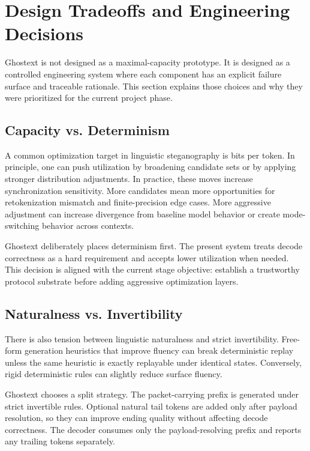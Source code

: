 \section{Design Tradeoffs and Engineering Decisions}

Ghostext is not designed as a maximal-capacity prototype. It is designed as a controlled engineering system where each component has an explicit failure surface and traceable rationale. This section explains those choices and why they were prioritized for the current project phase.

\subsection{Capacity vs. Determinism}

A common optimization target in linguistic steganography is bits per token. In principle, one can push utilization by broadening candidate sets or by applying stronger distribution adjustments. In practice, these moves increase synchronization sensitivity. More candidates mean more opportunities for retokenization mismatch and finite-precision edge cases. More aggressive adjustment can increase divergence from baseline model behavior or create mode-switching behavior across contexts.

Ghostext deliberately places determinism first. The present system treats decode correctness as a hard requirement and accepts lower utilization when needed. This decision is aligned with the current stage objective: establish a trustworthy protocol substrate before adding aggressive optimization layers.

\subsection{Naturalness vs. Invertibility}

There is also tension between linguistic naturalness and strict invertibility. Free-form generation heuristics that improve fluency can break deterministic replay unless the same heuristic is exactly replayable under identical states. Conversely, rigid deterministic rules can slightly reduce surface fluency.

Ghostext chooses a split strategy. The packet-carrying prefix is generated under strict invertible rules. Optional natural tail tokens are added only after payload resolution, so they can improve ending quality without affecting decode correctness. The decoder consumes only the payload-resolving prefix and reports any trailing tokens separately.


